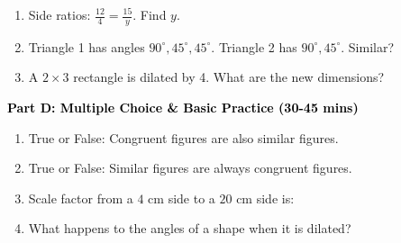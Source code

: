 \documentclass[12pt, letterpaper, fleqn]{article}
\newcommand{\blank}{\underline{\hspace{2.2cm}}}
\begin{document}
\begin{enumerate}[itemsep=2.5cm, leftmargin=0.6cm, resume]
\item Side ratios: $\frac{12}{4} = \frac{15}{y}$. Find $y$. \blank
\item Triangle 1 has angles $90^\circ, 45^\circ, 45^\circ$. Triangle 2 has $90^\circ, 45^\circ$. Similar? \blank
\item A $2\times3$ rectangle is dilated by 4. What are the new dimensions? \blank
\end{enumerate}

\newpage

\begin{tcolorbox}[colback=customteal!20]
\large\textcolor{black}{\textbf{Part D: Multiple Choice \& Basic Practice (30-45 mins)}}
\end{tcolorbox}

\vspace{3mm}

\begin{enumerate}[itemsep=2.5cm, leftmargin=0.6cm, resume]
\item True or False: Congruent figures are also similar figures. \blank
\item True or False: Similar figures are always congruent figures. \blank
\item Scale factor from a $4\text{ cm}$ side to a $20\text{ cm}$ side is: \blank
\item What happens to the angles of a shape when it is dilated? \blank
\end{enumerate}
\end{document}
